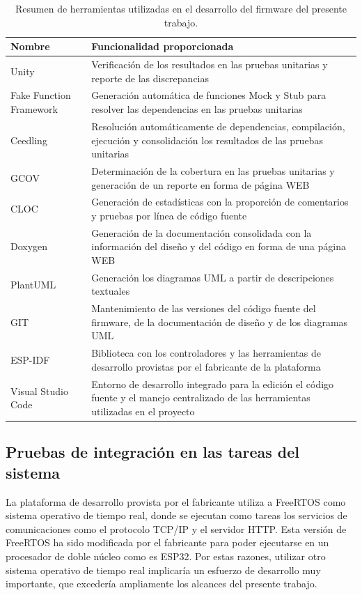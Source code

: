 \begin{table}[ht]
	\centering
	\caption[Herramientas utilizadas para el desarrollo del firmware]{Resumen de herramientas utilizadas en el desarrollo del firmware del presente trabajo.}
	\begin{tabular}{L{25mm} L{100mm}}    
		\toprule
		\textbf{Nombre} & 
		\textbf{Funcionalidad proporcionada} \\
		\midrule
		Unity & 
		Verificación de los resultados en las pruebas unitarias y reporte de las discrepancias \\
		Fake Function Framework &
		Generación automática de funciones Mock y Stub para resolver las dependencias en las pruebas unitarias \\
		Ceedling &
		Resolución automáticamente de dependencias, compilación, ejecución y consolidación los resultados de las pruebas unitarias \\
		GCOV &
		Determinación de la cobertura en las pruebas unitarias y generación de un reporte en forma de página WEB \\
		CLOC &
		Generación de estadísticas con la proporción de comentarios y pruebas por línea de código fuente \\
		Doxygen &
		Generación de la documentación consolidada con la información del diseño y del código en forma de una página WEB \\
		PlantUML &
		Generación los diagramas UML a partir de descripciones textuales \\
		GIT &
		Mantenimiento de las versiones del código fuente del firmware, de la documentación de diseño y de los diagramas UML \\
		ESP-IDF &
		Biblioteca con los controladores y las herramientas de desarrollo provistas por el fabricante de la plataforma \\
		Visual Studio Code &
		Entorno de desarrollo integrado para la edición el código fuente y el manejo centralizado de las herramientas utilizadas en el proyecto \\
		\bottomrule
		\hline
	\end{tabular}
	\label{tab:HerramientasDesarrollo}
\end{table}

\subsection{Pruebas de integración en las tareas del sistema}

La plataforma de desarrollo provista por el fabricante utiliza a FreeRTOS\cite{noauthor_freertos_2019} como sistema operativo de tiempo real, donde se ejecutan como tareas los servicios de comunicaciones como el protocolo TCP/IP y el servidor HTTP. Esta versión de FreeRTOS ha sido modificada por el fabricante para poder ejecutarse en un procesador de doble núcleo como es ESP32\cite{noauthor_esp-idf_nodate-1}. Por estas razones, utilizar otro sistema operativo de tiempo real implicaría un esfuerzo de desarrollo muy importante, que excedería ampliamente los alcances del presente trabajo. 

